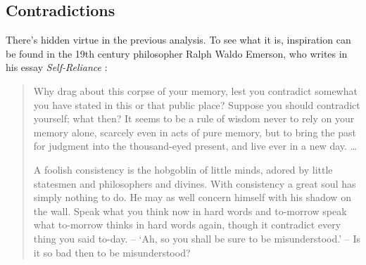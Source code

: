 \documentclass[11pt]{article}
\numberwithin{equation}{subsection}
\begin{document}
\subsection{Contradictions}\label{contradictions}

There's hidden virtue in the previous analysis.  To see what it is,
inspiration can be found in the 19th century philosopher Ralph Waldo Emerson, who
writes in his essay \emph{Self-Reliance} \citep{emerson_essays_2008}:
\begin{quote}
{ Why drag about this corpse of your memory, lest you contradict
  somewhat you have stated in this or that public place? Suppose you
  should contradict yourself; what then? It seems to be a rule of
  wisdom never to rely on your memory alone, scarcely even in acts of
  pure memory, but to bring the past for judgment into the
  thousand-eyed present, and live ever in a new day. \ldots}

{A foolish consistency is the hobgoblin of little minds, adored by
  little statesmen and philosophers and divines. With consistency a
  great soul has simply nothing to do. He may as well concern himself
  with his shadow on the wall. Speak what you think now in hard words
  and to-morrow speak what to-morrow thinks in hard words again, 
though it contradict every thing you said to-day. 
-- `Ah, so you shall be sure to be misunderstood.' -- Is it so bad
then to be misunderstood? }
\end{quote}
\end{document}
